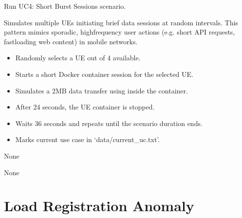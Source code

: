 \documentclass[letterpaper,10pt,english]{sphinxmanual}
\begin{document}
\begin{fulllineitems}
\label{\detokenize{uc4:uc4.run_uc4}}
\pysigstartsignatures
{}
\pysigstopsignatures
\sphinxAtStartPar
Run UC4: Short Burst Sessions scenario.

\sphinxAtStartPar
Simulates multiple UEs initiating brief data sessions at random intervals. This pattern mimics sporadic, high\sphinxhyphen{}frequency user actions
(e.g. short API requests, fast\sphinxhyphen{}loading web content) in mobile networks.
\begin{description}
\begin{itemize}
\item {} 
\sphinxAtStartPar
Randomly selects a UE out of 4 available.

\item {} 
\sphinxAtStartPar
Starts a short Docker container session for the selected UE.

\item {} 
\sphinxAtStartPar
Simulates a 2MB data transfer using  inside the container.

\item {} 
\sphinxAtStartPar
After 2\textendash{}4 seconds, the UE container is stopped.

\item {} 
\sphinxAtStartPar
Waits 3\textendash{}6 seconds and repeats until the scenario duration ends.

\item {} 
\sphinxAtStartPar
Marks current use case in ‘data/current\_uc.txt’.

\end{itemize}

\sphinxAtStartPar
None

\sphinxAtStartPar
None

\end{description}

\end{fulllineitems}


\sphinxstepscope


\chapter{Load Registration Anomaly}
\label{\detokenize{uc5:module-uc5}}\label{\detokenize{uc5:load-registration-anomaly}}\label{\detokenize{uc5::doc}}
\end{document}
